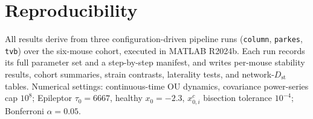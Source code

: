 \documentclass[11pt,a4paper]{article}
\newcommand{\Dst}{D_{\mathrm{st}}}
\newcommand{\xcrit}{x_{0,i}^{c}}
\begin{document}
\section{Reproducibility}
\label{app:repro}
All results derive from three configuration-driven pipeline runs (\texttt{column}, \texttt{parkes},
\texttt{tvb}) over the six-mouse cohort, executed in MATLAB R2024b. Each run records its full parameter
set and a step-by-step manifest, and writes per-mouse stability results, cohort summaries, strain
contrasts, laterality tests, and network-$\Dst$ tables. Numerical settings: continuous-time OU
dynamics, covariance power-series cap $10^8$; Epileptor $\tau_0=6667$, healthy $x_0=-2.3$, $\xcrit$
bisection tolerance $10^{-4}$; Bonferroni $\alpha=0.05$.


\end{document}
